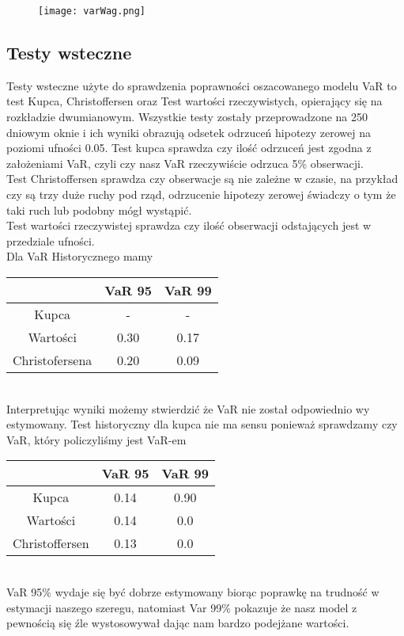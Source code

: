 \documentclass[]{article}
\begin{document}
	\begin{figure}[h!]
		\centering
		\texttt{[image: varWag.png]}
		\caption{}
		\label{fig:varwag}
	\end{figure}
	
	
	
	\subsection{Testy wsteczne}
	Testy wsteczne użyte do sprawdzenia poprawności oszacowanego modelu VaR to test Kupca, Christoffersen oraz Test wartości rzeczywistych, opierający się na rozkładzie dwumianowym. Wszystkie testy zostały przeprowadzone na 250 dniowym oknie i ich wyniki obrazują odsetek odrzuceń hipotezy zerowej na poziomi ufności 0.05. 
	Test kupca sprawdza czy ilość odrzuceń jest zgodna z założeniami VaR, czyli czy nasz VaR rzeczywiście odrzuca 5\% obserwacji. \\
	Test Christoffersen sprawdza czy obserwacje są nie zależne w czasie, na przykład czy są trzy duże ruchy pod rząd, odrzucenie hipotezy zerowej świadczy o tym że taki ruch lub podobny mógł wystąpić. \\
	Test wartości rzeczywistej sprawdza czy ilość obserwacji odstających jest w przedziale ufności.
	\\
	Dla VaR Historycznego  mamy \\
	\begin{tabular}{|c|c|c|}
		\hline
		& VaR 95 & VaR 99 \\
		\hline
		Kupca & - & - \\
		\hline
		Wartości & 0.30 & 0.17 \\
		\hline
		Christofersena & 0.20 & 0.09 \\
		\hline
	\end{tabular}\\
	Interpretując wyniki możemy stwierdzić że VaR nie został odpowiednio wy estymowany. 
	Test historyczny dla kupca nie ma sensu ponieważ sprawdzamy czy VaR, który policzyliśmy jest VaR-em \\
	
		\begin{tabular}{|c|c|c|}
		\hline
		& VaR 95 & VaR 99 \\
		\hline
		Kupca & 0.14 & 0.90 \\
		\hline
		Wartości & 0.14 & 0.0 \\
		\hline
		Christoffersen & 0.13 & 0.0 \\
		\hline
	\end{tabular}
\\
	VaR 95\% wydaje się być dobrze estymowany biorąc poprawkę na trudność w estymacji naszego szeregu, natomiast Var 99\% pokazuje że nasz model z pewnością się źle wystosowywał dając nam bardzo podejżane wartości. 
	
\end{document}
